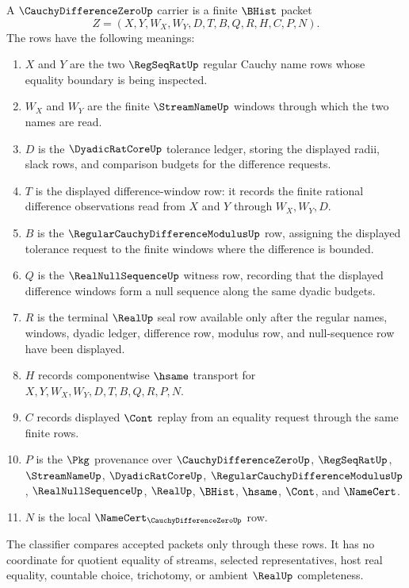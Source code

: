 \begin{definition}
\label{def:cauchy-difference-zero-carrier}
A $\CauchyDifferenceZeroUp$ carrier is a finite $\BHist$ packet
$$
Z=(X,Y,W_X,W_Y,D,T,B,Q,R,H,C,P,N).
$$
The rows have the following meanings:
\begin{enumerate}
\item $X$ and $Y$ are the two $\RegSeqRatUp$ regular Cauchy name rows whose equality boundary is being inspected.
\item $W_X$ and $W_Y$ are the finite $\StreamNameUp$ windows through which the two names are read.
\item $D$ is the $\DyadicRatCoreUp$ tolerance ledger, storing the displayed radii, slack rows, and comparison budgets for the difference requests.
\item $T$ is the displayed difference-window row: it records the finite rational difference observations read from $X$ and $Y$ through $W_X,W_Y,D$.
\item $B$ is the $\RegularCauchyDifferenceModulusUp$ row, assigning the displayed tolerance request to the finite windows where the difference is bounded.
\item $Q$ is the $\RealNullSequenceUp$ witness row, recording that the displayed difference windows form a null sequence along the same dyadic budgets.
\item $R$ is the terminal $\RealUp$ seal row available only after the regular names, windows, dyadic ledger, difference row, modulus row, and null-sequence row have been displayed.
\item $H$ records componentwise $\hsame$ transport for $X,Y,W_X,W_Y,D,T,B,Q,R,P,N$.
\item $C$ records displayed $\Cont$ replay from an equality request through the same finite rows.
\item $P$ is the $\Pkg$ provenance over $\CauchyDifferenceZeroUp$, $\RegSeqRatUp$, $\StreamNameUp$, $\DyadicRatCoreUp$, $\RegularCauchyDifferenceModulusUp$, $\RealNullSequenceUp$, $\RealUp$, $\BHist$, $\hsame$, $\Cont$, and $\NameCert$.
\item $N$ is the local $\NameCert_{\CauchyDifferenceZeroUp}$ row.
\end{enumerate}
The classifier compares accepted packets only through these rows. It has no coordinate for quotient equality of streams, selected representatives, host real equality, countable choice, trichotomy, or ambient $\RealUp$ completeness.
\end{definition}

